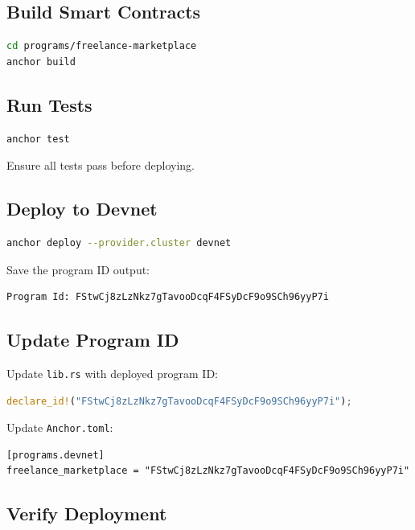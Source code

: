 \documentclass[a4paper,13pt,twoside]{report}
\theoremstyle{definition}
\begin{document}
\subsection{Build Smart Contracts}

\begin{lstlisting}[language=bash]
cd programs/freelance-marketplace
anchor build
\end{lstlisting}

\subsection{Run Tests}

\begin{lstlisting}[language=bash]
anchor test
\end{lstlisting}

Ensure all tests pass before deploying.

\subsection{Deploy to Devnet}

\begin{lstlisting}[language=bash]
anchor deploy --provider.cluster devnet
\end{lstlisting}

Save the program ID output:
\begin{lstlisting}
Program Id: FStwCj8zLzNkz7gTavooDcqF4FSyDcF9o9SCh96yyP7i
\end{lstlisting}

\subsection{Update Program ID}

Update \texttt{lib.rs} with deployed program ID:
\begin{lstlisting}[language=Rust]
declare_id!("FStwCj8zLzNkz7gTavooDcqF4FSyDcF9o9SCh96yyP7i");
\end{lstlisting}

Update \texttt{Anchor.toml}:
\begin{lstlisting}
[programs.devnet]
freelance_marketplace = "FStwCj8zLzNkz7gTavooDcqF4FSyDcF9o9SCh96yyP7i"
\end{lstlisting}

\subsection{Verify Deployment}
\end{document}
